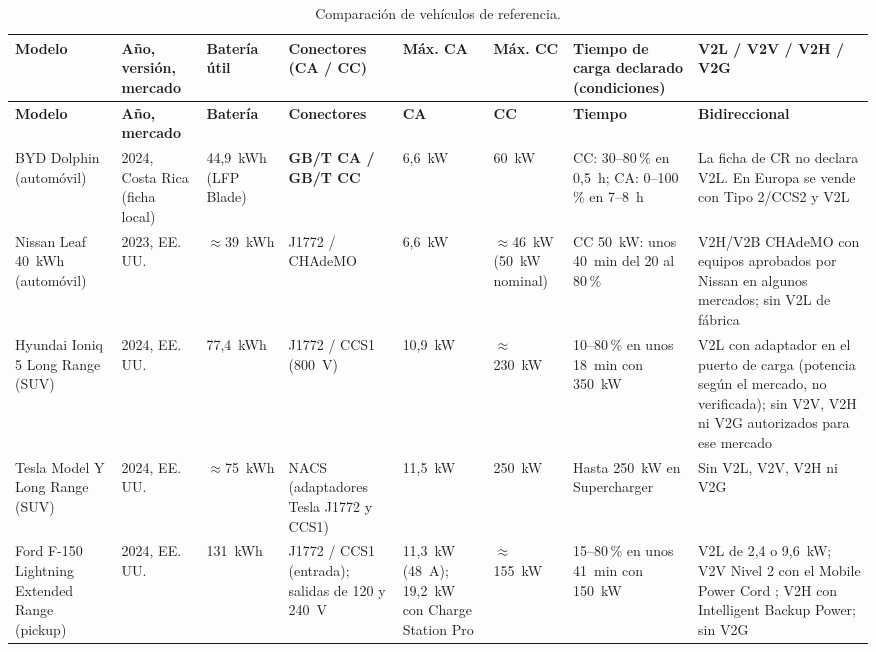 \begin{landscape}
\thispagestyle{lscape}
{\scriptsize
\begin{longtable}{L{2.9cm}L{2.6cm}L{1.6cm}L{2.7cm}L{1.7cm}L{1.7cm}L{4.2cm}L{4.4cm}}
\caption{Comparación de vehículos de referencia.}\label{tab:vehiculos}\\
\toprule
\textbf{Modelo} & \textbf{Año, versión, mercado} & \textbf{Batería útil} & \textbf{Conectores (CA / CC)} & \textbf{Máx. CA} & \textbf{Máx. CC} & \textbf{Tiempo de carga declarado (condiciones)} & \textbf{V2L / V2V / V2H / V2G}\\
\midrule\endfirsthead
\toprule
\textbf{Modelo} & \textbf{Año, mercado} & \textbf{Batería} & \textbf{Conectores} & \textbf{CA} & \textbf{CC} & \textbf{Tiempo} & \textbf{Bidireccional}\\
\midrule\endhead
BYD Dolphin (automóvil) & 2024, Costa Rica (ficha local) & 44,9~kWh (LFP Blade) & \textbf{GB/T CA / GB/T CC} & 6,6~kW & 60~kW & CC: 30--80\,\% en 0,5~h; CA: 0--100\,\% en 7--8~h \cite{bydDolphin} & La ficha de CR no declara V2L. En Europa se vende con Tipo 2/CCS2 y V2L\\
Nissan Leaf 40~kWh (automóvil) & 2023, EE. UU. & $\approx$39~kWh \supuesto{} & J1772 / CHAdeMO & 6,6~kW & $\approx$46~kW (50~kW nominal) & CC 50~kW: unos 40~min del 20 al 80\,\% \cite{nissan} & V2H/V2B CHAdeMO con equipos aprobados por Nissan en algunos mercados; sin V2L de fábrica\\
Hyundai Ioniq 5 Long Range (SUV) & 2024, EE. UU. & 77,4~kWh & J1772 / CCS1 (800~V) & 10,9~kW & $\approx$230~kW & 10--80\,\% en unos 18~min con 350~kW \cite{hyundai} & V2L con adaptador en el puerto de carga (potencia según el mercado, no verificada); sin V2V, V2H ni V2G autorizados para ese mercado\\
Tesla Model Y Long Range (SUV) & 2024, EE. UU. & $\approx$75~kWh \supuesto{} & NACS (adaptadores Tesla J1772 y CCS1) & 11,5~kW & 250~kW & Hasta 250~kW en Supercharger \cite{tesla} & Sin V2L, V2V, V2H ni V2G\\
Ford F-150 Lightning Extended Range (pickup) & 2024, EE. UU. & 131~kWh & J1772 / CCS1 (entrada); salidas de 120 y 240~V & 11,3~kW (48~A); 19,2~kW con Charge Station Pro & $\approx$155~kW & 15--80\,\% en unos 41~min con 150~kW \cite{fordLightning} & V2L de 2,4 o 9,6~kW; V2V Nivel 2 con el Mobile Power Cord \cite{fordFAQ}; V2H con Intelligent Backup Power; sin V2G\\
\bottomrule
\end{longtable}}
\end{landscape}

